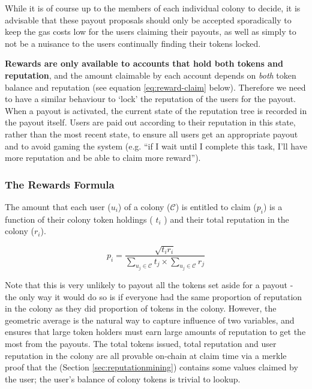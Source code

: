 While it is of course up to the members of each individual colony to decide, it is advisable that these payout proposals should only be accepted sporadically to keep the gas costs low for the users claiming their payouts, as well as simply to not be a nuisance to the users continually finding their tokens locked.

\textbf{Rewards are only available to accounts that hold both tokens and reputation}, and the amount claimable by each account depends on \emph{both} token balance and reputation (see equation \eqref{eq:reward-claim} below). Therefore we need to have a similar behaviour to `lock' the reputation of the users for the payout. When a payout is activated, the current state of the reputation tree is recorded in the payout itself. Users are paid out according to their reputation in this state, rather than the most recent state, to ensure all users get an appropriate payout and to avoid gaming the system (e.g. ``if I wait until I complete this task, I'll have more reputation and be able to claim more reward'').

\subsubsection*{The Rewards Formula}
The amount that each user ($u_i$) of a colony ($\mathcal{C}$) is entitled to claim ($p_i$) is a function of their colony token holdings ( $t_i$ ) and their total reputation in the colony ($r_i$).

\begin{equation}\label{eq:reward-claim}
 p_i = \frac{\sqrt{t_i r_i}}{\sum\limits_{u_j\in \mathcal{C}} t_j \times \sum\limits_{u_j\in \mathcal{C}} r_j}
\end{equation}

Note that this is very unlikely to payout all the tokens set aside for a payout - the only way it would do so is if everyone had the same proportion of reputation in the colony as they did proportion of tokens in the colony. However, the geometric average is the natural way to capture influence of two variables, and ensures that large token holders must earn large amounts of reputation to get the most from the payouts. The total tokens issued, total reputation and user reputation in the colony are all provable on-chain at claim time via a merkle proof that the  (Section \ref{sec:reputationmining}) contains some values claimed by the user; the user's balance of colony tokens is trivial to lookup.

